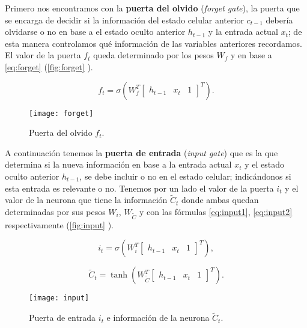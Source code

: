 Primero nos encontramos con la \textbf{puerta del olvido} (\emph{forget gate}), la puerta que se encarga de decidir si la información del estado celular anterior $c_{t-1}$ debería olvidarse o no en base a el estado oculto anterior $h_{t-1}$ y la entrada actual $x_t$; de esta manera controlamos qué información de las variables anteriores recordamos. El valor de la puerta $f_t$ queda determinado por los pesos $W_f$ y en base a \eqref{eq:forget} (\autoref{fig:forget} \cite{christopher2015lstm}).

\begin{equation}
  f_t = \sigma\left(W_f^T \begin{bmatrix} h_{t-1} & x_t & 1 \end{bmatrix}^T \right).
  \label{eq:forget}
\end{equation}

\begin{figure}[htpb]
  \centering
  \texttt{[image: forget]}
  \caption{Puerta del olvido $f_t$.}
  \label{fig:forget}
\end{figure}

A continuación tenemos la \textbf{puerta de entrada} (\emph{input gate}) que es la que determina si la nueva información en base a la entrada actual $x_t$ y el estado oculto anterior $h_{t-1}$, se debe incluir o no en el estado celular; indicándonos si esta entrada es relevante o no. Tenemos por un lado el valor de la puerta $i_t$ y el valor de la neurona que tiene la información $\widetilde{C}_t$ donde ambas quedan determinadas por sus pesos $W_i$, $W_{\widetilde{C}}$ y con las fórmulas \eqref{eq:input1}, \eqref{eq:input2} respectivamente (\autoref{fig:input} \cite{christopher2015lstm}).

\begin{equation}
  i_t = \sigma\left(W_i^T \begin{bmatrix} h_{t-1} & x_t & 1 \end{bmatrix}^T\right),
  \label{eq:input1}
\end{equation}

\begin{equation}
  \widetilde{C}_t = \tanh\left(W_{\widetilde{C}}^T \begin{bmatrix} h_{t-1} & x_t & 1 \end{bmatrix}^T\right).
  \label{eq:input2}
\end{equation}

\begin{figure}[htpb]
  \centering
  \texttt{[image: input]}
  \caption{Puerta de entrada $i_t$ e información de la neurona $\widetilde{C}_t$.}
  \label{fig:input}
\end{figure}

